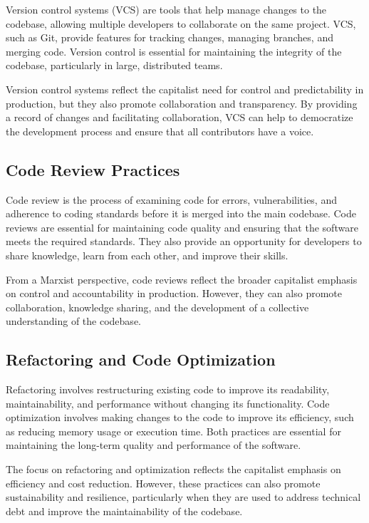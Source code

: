 \begin{refsection}
\begin{multicols}{2}
{Version control systems (VCS) are tools that help manage changes to the codebase, allowing multiple developers to collaborate on the same project. VCS, such as Git, provide features for tracking changes, managing branches, and merging code. Version control is essential for maintaining the integrity of the codebase, particularly in large, distributed teams.

Version control systems reflect the capitalist need for control and predictability in production, but they also promote collaboration and transparency. By providing a record of changes and facilitating collaboration, VCS can help to democratize the development process and ensure that all contributors have a voice.

\subsection{Code Review Practices}

Code review is the process of examining code for errors, vulnerabilities, and adherence to coding standards before it is merged into the main codebase. Code reviews are essential for maintaining code quality and ensuring that the software meets the required standards. They also provide an opportunity for developers to share knowledge, learn from each other, and improve their skills.

From a Marxist perspective, code reviews reflect the broader capitalist emphasis on control and accountability in production. However, they can also promote collaboration, knowledge sharing, and the development of a collective understanding of the codebase.

\subsection{Refactoring and Code Optimization}

Refactoring involves restructuring existing code to improve its readability, maintainability, and performance without changing its functionality. Code optimization involves making changes to the code to improve its efficiency, such as reducing memory usage or execution time. Both practices are essential for maintaining the long-term quality and performance of the software.

The focus on refactoring and optimization reflects the capitalist emphasis on efficiency and cost reduction. However, these practices can also promote sustainability and resilience, particularly when they are used to address technical debt and improve the maintainability of the codebase.

}
\end{multicols}
\end{refsection}
